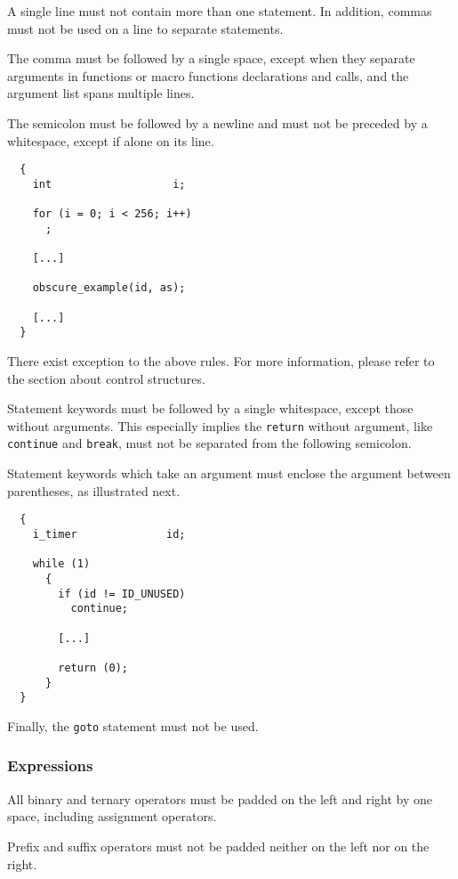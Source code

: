 A single line must not contain more than one statement. In addition, commas
must not be used on a line to separate statements.

The comma must be followed by a single space, except when they separate
arguments in functions or macro functions declarations and calls, and the
argument list spans multiple lines.

The semicolon must be followed by a newline and must not be preceded by
a whitespace, except if alone on its line.

\begin{verbatim}
  {
    int                   i;

    for (i = 0; i < 256; i++)
      ;

    [...]

    obscure_example(id, as);

    [...]
  }
\end{verbatim}

There exist exception to the above rules. For more information, please
refer to the section about control structures.

Statement keywords must be followed by a single whitespace, except
those without arguments. This especially implies the \texttt{return} without
argument, like \texttt{continue} and \texttt{break}, must not be separated
from the following semicolon.

Statement keywords which take an argument must enclose the argument
between parentheses, as illustrated next.

\begin{verbatim}
  {
    i_timer              id;

    while (1)
      {
        if (id != ID_UNUSED)
          continue;

        [...]

        return (0);
      }
  }
\end{verbatim}

Finally, the \texttt{goto} statement must not be used.


\subsubsection{Expressions}

All binary and ternary operators must be padded on the left and right by
one space, including assignment operators.

Prefix and suffix operators must not be padded neither on the left nor on
the right.

